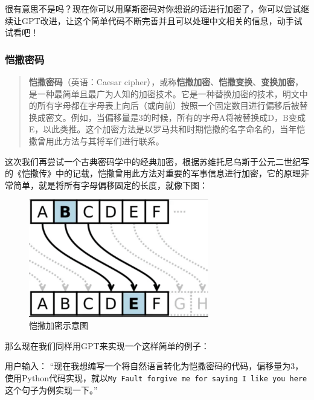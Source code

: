 很有意思不是吗？现在你可以用摩斯密码对你想说的话进行加密了，你可以尝试继续让GPT改进，让这个简单代码不断完善并且可以处理中文相关的信息，动手试试看吧！

\hypertarget{ux607aux6492ux5bc6ux7801}{%
  \subsubsection{恺撒密码}\label{ux607aux6492ux5bc6ux7801}}

\begin{quote}
  \textbf{恺撒密码}（英语：Caesar
  cipher），或称\textbf{恺撒加密}、\textbf{恺撒变换}、\textbf{变换加密}，是一种最简单且最广为人知的加密技术。它是一种替换加密的技术，明文中的所有字母都在字母表上向后（或向前）按照一个固定数目进行偏移后被替换成密文。例如，当偏移量是3的时候，所有的字母A将被替换成D，B变成E，以此类推。这个加密方法是以罗马共和时期恺撒的名字命名的，当年恺撒曾用此方法与其将军们进行联系。
\end{quote}

这次我们再尝试一个古典密码学中的经典加密，根据苏维托尼乌斯于公元二世纪写的《恺撒传》中的记载，恺撒曾用此方法对重要的军事信息进行加密，它的原理非常简单，就是将所有字母偏移固定的长度，就像下图：

\centering
\begin{figure}[H] %
  \centering %
  \includegraphics[width=0.7\textwidth]{assets/figures/image-20250210174403824.png} %
  \caption{恺撒加密示意图} %
  \label{Fig.main1} %
\end{figure}%

那么现在我们同样用GPT来实现一个这样简单的例子：

用户输入：
``现在我想编写一个将自然语言转化为恺撒密码的代码，偏移量为3，使用Python代码实现，就以\texttt{My\ Fault\ forgive\ me\ for\ saying\ I\ like\ you\ here}这个句子为例实现一下。''

